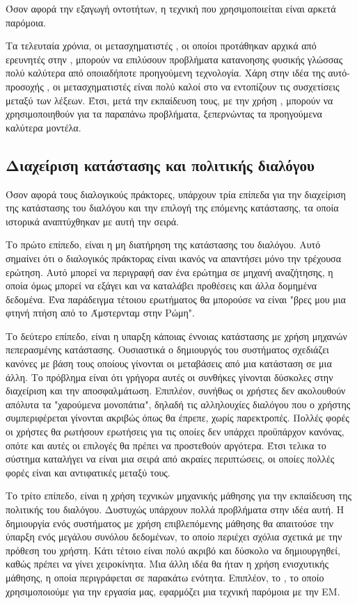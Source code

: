 Όσον αφορά την εξαγωγή οντοτήτων, η τεχνική που χρησιμοποιείται είναι αρκετά παρόμοια.

Τα τελευταία χρόνια, οι μετασχηματιστές , οι οποίοι προτάθηκαν αρχικά από ερευνητές στην \cite{attention2017}, μπορούν να επιλύσουν προβλήματα κατανοησης φυσικής γλώσσας πολύ καλύτερα από οποιαδήποτε προηγούμενη τεχνολογία. Χάρη στην ιδέα της αυτό-προσοχής , οι μετασχηματιστές είναι πολύ καλοί στο να εντοπίζουν τις συσχετίσεις μεταξύ των λέξεων. Έτσι, μετά την εκπαίδευση τους, με την χρήση , μπορούν να χρησιμοποιηθούν για τα παραπάνω προβλήματα, ξεπερνώντας τα προηγούμενα καλύτερα μοντέλα.

\subsection{Διαχείριση κατάστασης και πολιτικής διαλόγου}

Όσον αφορά τους διαλογικούς πράκτορες, υπάρχουν τρία επίπεδα για την διαχείριση της κατάστασης του διαλόγου και την επιλογή της επόμενης κατάστασης, τα οποία ιστορικά αναπτύχθηκαν με αυτή την σειρά.

Το πρώτο επίπεδο, είναι η μη διατήρηση της κατάστασης του διαλόγου. Αυτό σημαίνει ότι ο διαλογικός πράκτορας είναι ικανός να απαντήσει μόνο την τρέχουσα ερώτηση. Αυτό μπορεί να περιγραφή σαν ένα ερώτημα σε μηχανή αναζήτησης, η οποία όμως μπορεί να εξάγει και να καταλάβει προθέσεις και άλλα δομημένα δεδομένα. Ένα παράδειγμα τέτοιου ερωτήματος θα μπορούσε να είναι "βρες μου μια φτηνή πτήση από το Άμστερνταμ στην Ρώμη".

Το δεύτερο επίπεδο, είναι η υπαρξη κάποιας έννοιας κατάστασης με χρήση μηχανών πεπερασμένης κατάστασης. Ουσιαστικά ο δημιουργός του συστήματος σχεδιάζει κανόνες με βάση τους οποίους γίνονται οι μεταβάσεις από μια κατάσταση σε μια άλλη. Το πρόβλημα είναι ότι γρήγορα αυτές οι συνθήκες γίνονται δύσκολες στην διαχείριση και την αποσφαλμάτωση. Επιπλέον, συνήθως οι χρήστες δεν ακολουθούν απόλυτα τα "χαρούμενα μονοπάτια", δηλαδή τις αλληλουχίες διαλόγου που ο χρήστης συμπεριφέρεται γίνονται ακριβώς όπως θα έπρεπε, χωρίς παρεκτροπές. Πολλές φορές οι χρήστες θα ρωτήσουν ερωτήσεις για τις οποίες δεν υπάρχει προϋπάρχον κανόνας, οπότε και αυτές οι επιλογές θα πρέπει να προστεθούν αργότερα. Έτσι τελικα το σύστημα καταλήγει να είναι μια σειρά από ακραίες περιπτώσεις, οι οποίες πολλές φορές είναι και αντιφατικές μεταξύ τους.

Το τρίτο επίπεδο, είναι η χρήση τεχνικών μηχανικής μάθησης για την εκπαίδευση της πολιτικής του διαλόγου. Δυστυχώς υπάρχουν πολλά προβλήματα στην ιδέα αυτή. Η δημιουργία ενός συστήματος με χρήση επιβλεπόμενης μάθησης θα απαιτούσε την ύπαρξη ενός μεγάλου συνόλου δεδομένων, το οποίο περιέχει σχόλια σχετικά με την πρόθεση του χρήστη. Κάτι τέτοιο είναι πολύ ακριβό και δύσκολο να δημιουργηθεί, καθώς πρέπει να γίνει χειροκίνητα. Μια άλλη ιδέα θα ήταν η χρήση ενισχυτικής μάθησης, η οποία περιγράφεται σε παρακάτω ενότητα. Επιπλέον, το , το οποίο χρησιμοποιούμε για την εργασία μας, εφαρμόζει μια τεχνική παρόμοια με την ΕΜ.

